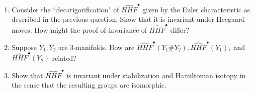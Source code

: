 

        \begin{enumerate}
            \item Consider the ``decatigorification" of $\widehat{HHF}^\bullet$ given by the Euler characteristic as described in the previous question. Show that it is invariant under Heegaard moves. How might the proof of invariance of $\widehat{HHF}^\bullet$ differ?
        \item  Suppose $Y_1,Y_2$ are $3$-manifolds. How are $\widehat{HHF}^\bullet(Y_1\# Y_2),\widehat{HHF}^\bullet(Y_1),$ and $\widehat{HHF}^\bullet(Y_2)$ related?
    \item Show that $\widehat{HHF}^\bullet$ is invariant under stabilization and Hamiltonian isotopy in the sense that the resulting groups are isomorphic.
        \end{enumerate}
